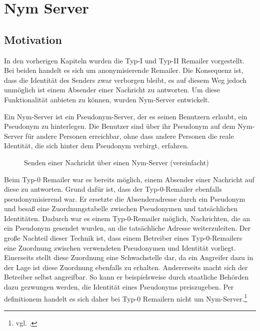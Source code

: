 \chapter{Nym Server}

\section{Motivation}
In den vorherigen Kapiteln wurden die Typ-I und Typ-II Remailer vorgestellt. Bei beiden handelt es sich um anonymisierende Remailer. Die Konsequenz ist, dass die Identität des Senders zwar verborgen bleibt, es auf diesem Weg jedoch unmöglich ist einem Absender einer Nachricht zu antworten. Um diese Funktionalität anbieten zu können, wurden Nym-Server entwickelt.

Ein Nym-Server ist ein Pseudonym-Server, der es seinen Benutzern erlaubt, ein Pseudonym zu hinterlegen. Die Benutzer sind über ihr Pseudonym auf dem Nym-Server für andere Personen  erreichbar, ohne dass andere Personen die reale Identität, die sich hinter dem Pseudonym verbirgt, erfahren.

\begin{figure}
	\centering
	\begin{sequencediagram}
	\end{sequencediagram}
	\caption{Senden einer Nachricht über einen Nym-Server (vereinfacht)}
\end{figure}

Beim Typ-0 Remailer war es bereits möglich, einem Absender einer Nachricht auf diese zu antworten. Grund dafür ist, dass der Typ-0-Remailer ebenfalls pseudonymisierend war. Er ersetzte die Absenderadresse durch ein Pseudonym und besaß eine Zuordnungstabelle zwischen Pseudonymen und tatsächlichen Identitäten. Dadurch war es einem Typ-0-Remailer möglich, Nachrichten, die an ein Pseudonym gesendet wurden, an die tatsächliche Adresse weiterzuleiten. Der große Nachteil dieser Technik ist, dass einem Betreiber eines Typ-0-Remailers eine Zuordnung zwischen verwendeten Pseudonymen und Identität vorliegt. Einerseits stellt diese Zuordnung eine Schwachstelle dar, da ein Angreifer dazu in der Lage ist diese Zuordnung ebenfalls zu erhalten. Andererseits macht sich der Betreiber selbst angreifbar. So kann er beispielsweise durch staatliche Behörden dazu gezwungen werden, die Identität eines Pseudonyms preiszugeben. Per definitionem handelt es sich daher bei Typ-0 Remailern nicht um Nym-Server.\footnote{vgl. \cite{nymdefinition}.}


